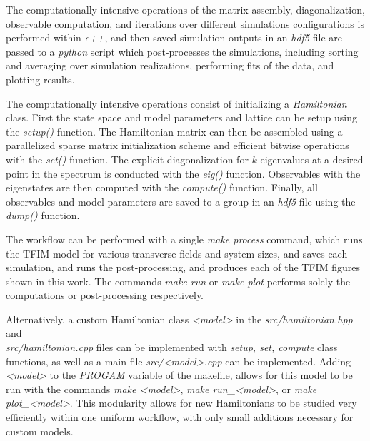 \documentclass[12pt]{article}{}
\begin{document}
The computationally intensive operations of the matrix assembly, diagonalization, observable computation, and iterations over different simulations configurations is performed within \emph{c++}, and then saved simulation outputs in an \emph{hdf5} file are passed to a \emph{python} script which post-processes the simulations, including sorting and averaging over simulation realizations, performing fits of the data, and plotting results. 

The computationally intensive operations consist of initializing a \emph{Hamiltonian} class. First the state space and model parameters and lattice can be setup using the \emph{setup()} function. The Hamiltonian matrix can then be assembled using a parallelized sparse matrix initialization scheme and efficient bitwise operations \cite{Sandvik2010,Jung2020} with the \emph{set()} function. The explicit diagonalization for $k$ eigenvalues at a desired point in the spectrum is conducted with the \emph{eig()} function. Observables with the eigenstates are then computed with the \emph{compute()} function. Finally, all observables and model parameters are saved to a group in an \emph{hdf5} file using the \emph{dump()} function.

The workflow can be performed with a single \emph{make process} command, which runs the TFIM model for various transverse fields and system sizes, and saves each simulation, and runs the post-processing, and produces each of the TFIM figures shown in this work. The commands \emph{make run} or \emph{make plot} performs solely the computations or post-processing respectively. 

Alternatively, a custom Hamiltonian class \emph{<model>} in the \emph{src/hamiltonian.hpp} and \\\emph{src/hamiltonian.cpp} files can be implemented with \emph{setup, set, compute} class functions, as well as a main file \emph{src/<model>.cpp} can be implemented. Adding \emph{<model>} to the \emph{PROGAM} variable of the makefile, allows for this model to be run with the commands \emph{make <model>}, \emph{make run\_<model>}, or \emph{make plot\_<model>}. This modularity allows for new Hamiltonians to be studied very efficiently within one uniform workflow, with only small additions necessary for custom models.
\end{document}
